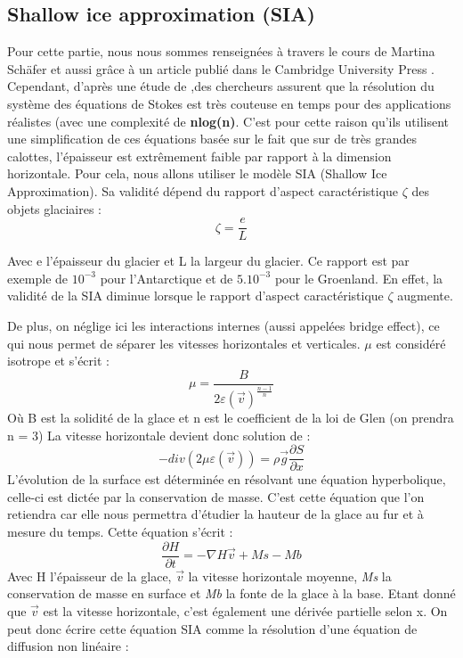 \documentclass{article}
\begin{document}
 \newpage
\subsection{Shallow ice approximation (SIA)}


Pour cette partie, nous nous sommes renseignées à travers le cours de Martina Schäfer \cite{schafer2007modelisation} et aussi grâce à un article publié dans le Cambridge University Press  \cite{seroussi_morlighem_rignot_khazendar_larour_mouginot_2013}.
\newline
Cependant, d'après une étude de ,des chercheurs assurent que la résolution du système des équations de Stokes est très couteuse en temps pour des applications réalistes (avec une complexité de \textbf{nlog(n)}. C'est pour cette raison qu'ils utilisent une simplification de ces équations basée sur le fait que sur de très grandes calottes, l'épaisseur est extrêmement faible par rapport à la dimension horizontale. Pour cela, nous allons utiliser le modèle SIA (Shallow Ice Approximation). Sa validité dépend du rapport d'aspect caractéristique $\zeta$ des objets glaciaires :
\begin{equation}
\zeta = \frac{e}{L}
\label{eq2} 
\end{equation}

Avec e l'épaisseur du glacier et L la largeur du glacier. Ce rapport est par exemple de $10^{-3}$ pour l'Antarctique et de $5.10^{-3}$ pour le Groenland. En effet, la validité de la SIA diminue lorsque le rapport d'aspect caractéristique $\zeta$ augmente. 

De plus, on néglige ici les interactions internes (aussi appelées bridge effect), ce qui nous permet de séparer les vitesses horizontales et verticales. $\mu$ est considéré isotrope et s'écrit :
\begin{equation}
\mu = \frac{B}{2\varepsilon(\vec{v})^\frac{n-1}{n}}
\label{eq2}      
\end{equation}
Où B est la solidité de la glace et n est le coefficient de la loi de Glen (on prendra n = 3)
\newline
La vitesse horizontale devient donc solution de :
\begin{equation}
-div(2 \mu \varepsilon(\vec{v}))  = \rho \vec{g}\frac{{\partial}S}{\partial x}
\label{eq3}
\end{equation}
L'évolution de la surface est déterminée en résolvant une équation hyperbolique, celle-ci est dictée par la conservation de masse. C'est cette équation que l'on retiendra car elle nous permettra d'étudier la hauteur de la glace au fur et à mesure du temps.
Cette équation s'écrit :
\begin{equation}
\frac{\partial H}{\partial t}=-\nabla H\vec{v} + Ms - Mb
\label{eq3}
\end{equation}
Avec H l'épaisseur de la glace, $\vec{v}$ la vitesse horizontale moyenne, \textit{Ms} la conservation de masse en surface et \textit{Mb} la fonte de la glace à la base.
Etant donné que $\vec{v}$ est la vitesse horizontale, c'est également une dérivée partielle selon x.
On peut donc écrire cette équation SIA comme la résolution d'une équation de diffusion non linéaire : 
\end{document}
